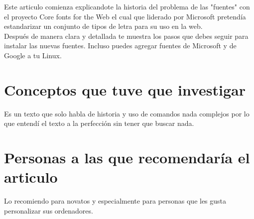 \documentclass[11pt, a4paper]{report}
\begin{document}
Este articulo comienza explicandote la historia del problema de las "fuentes"
con el proyecto Core fonts for the Web el cual que liderado por Microsoft
pretendía estandarizar un conjunto de tipos de letra para su uso en la web. \\

Después de manera clara y detallada te muestra los pasos que debes seguir para
instalar las nuevas fuentes. Incluso puedes agregar fuentes de Microsoft y de
Google a tu Linux.

\section*{Conceptos que tuve que investigar}
Es un texto que solo habla de historia y uso de comandos nada complejos por lo
que entendí el texto a la perfección sin tener que buscar nada.

\section*{Personas a las que recomendaría el articulo}
Lo recomiendo para novatos y especialmente para personas que les gusta
personalizar sus ordenadores.
\end{document}
